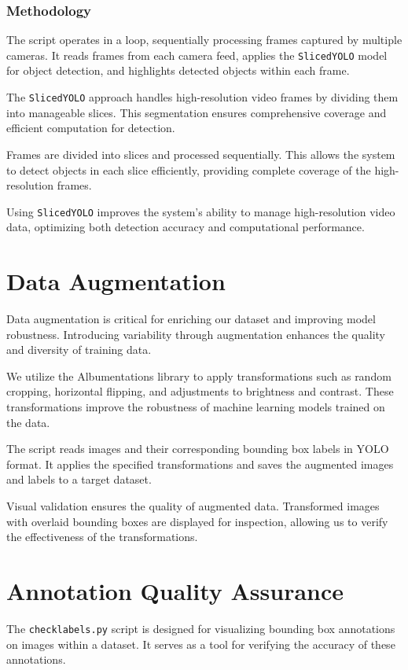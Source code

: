 \documentclass{template}
\begin{document}
\subsubsection{Methodology}
The script operates in a loop, sequentially processing frames captured by multiple cameras. It reads frames from each camera feed, applies the \texttt{SlicedYOLO} model for object detection, and highlights detected objects within each frame. 

The \texttt{SlicedYOLO} approach handles high-resolution video frames by dividing them into manageable slices. This segmentation ensures comprehensive coverage and efficient computation for detection.

Frames are divided into slices and processed sequentially. This allows the system to detect objects in each slice efficiently, providing complete coverage of the high-resolution frames.

Using \texttt{SlicedYOLO} improves the system's ability to manage high-resolution video data, optimizing both detection accuracy and computational performance.

\section{Data Augmentation}

Data augmentation is critical for enriching our dataset and improving model robustness. Introducing variability through augmentation enhances the quality and diversity of training data.

We utilize the Albumentations library to apply transformations such as random cropping, horizontal flipping, and adjustments to brightness and contrast. These transformations improve the robustness of machine learning models trained on the data.

The script reads images and their corresponding bounding box labels in YOLO format. It applies the specified transformations and saves the augmented images and labels to a target dataset.

Visual validation ensures the quality of augmented data. Transformed images with overlaid bounding boxes are displayed for inspection, allowing us to verify the effectiveness of the transformations.

\section{Annotation Quality Assurance}

The \texttt{checklabels.py} script is designed for visualizing bounding box annotations on images within a dataset. It serves as a tool for verifying the accuracy of these annotations.
\end{document}
